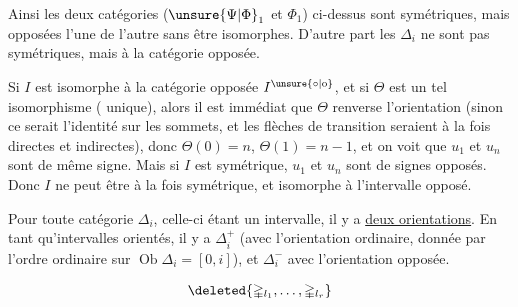 
Ainsi les deux catégories ($\unsure{\Psi|\Phi}_1$ et $\Phi_1$) ci-dessus sont symétriques, mais opposées l'une de l'autre sans être isomorphes. D'autre part \deleted{$\mathbb{\Delta}$} les $\mathbb{\Delta}_i$ ne sont pas symétriques, mais   à la catégorie opposée.

Si $I$ est isomorphe à la catégorie opposée $I^{\unsure{\circ|\mathrm{o}}}$, et si $\Theta$ est un tel isomorphisme ( unique), alors   il est immédiat que $\Theta$ renverse l'orientation (sinon ce serait l'identité sur les sommets, et les flèches de transition seraient à la fois directes et indirectes),  donc $\Theta(0)=n$, $\Theta(1)=n-1$, et on voit que $u_1$ et $u_n$ sont de même signe. Mais si $I$ est symétrique, $u_1$ et $u_n$ sont de signes opposés. Donc $I$ ne peut être à la fois symétrique, et isomorphe à  l'intervalle opposé.

Pour toute catégorie $\mathbb{\Delta}_i$, celle-ci étant un intervalle, il y a  \uline{deux orientations}.  En tant qu'intervalles orientés, il y a $\mathbb{\Delta}_i^+$ (avec l'orientation ordinaire, donnée par l'ordre ordinaire sur $\operatorname{Ob}\mathbb{\Delta}_i=[0,i]$), et $\mathbb{\Delta}_i^-$ avec l'orientation opposée.



\[\deleted{\mathbb{\Delta}_{l_1},\ldots,\mathbb{\Delta}_{l_r}}\]


